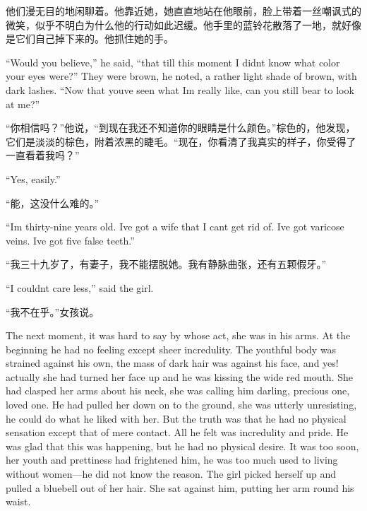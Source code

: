 \begin{paracol}{2}
\switchcolumn

他们漫无目的地闲聊着。他靠近她，她直直地站在他眼前，脸上带着一丝嘲讽式的微笑，似乎不明白为什么他的行动如此迟缓。他手里的蓝铃花散落了一地，就好像是它们自己掉下来的。他抓住她的手。

\switchcolumn*

``Would you believe,'' he said, ``that till this moment I
didn\textquotesingle t know what color your eyes were?'' They were brown,
he noted, a rather light shade of brown, with dark lashes. ``Now that
you\textquotesingle ve seen what I\textquotesingle m really like, can
you still bear to look at me?''

\switchcolumn

``你相信吗？''他说，``到现在我还不知道你的眼睛是什么颜色。''棕色的，他发现，它们是淡淡的棕色，附着浓黑的睫毛。``现在，你看清了我真实的样子，你受得了一直看着我吗？''

\switchcolumn*

``Yes, easily.''

\switchcolumn

``能，这没什么难的。''

\switchcolumn*

``I\textquotesingle m thirty-nine years old. I\textquotesingle ve got a
wife that I can\textquotesingle t get rid of. I\textquotesingle ve got
varicose veins. I\textquotesingle ve got five false teeth.''

\switchcolumn

``我三十九岁了，有妻子，我不能摆脱她。我有静脉曲张，还有五颗假牙。''

\switchcolumn*

``I couldn\textquotesingle t care less,'' said the girl.

\switchcolumn

``我不在乎。''女孩说。

\switchcolumn*

The next moment, it was hard to say by whose act, she was in his arms.
At the beginning he had no feeling except sheer incredulity. The
youthful body was strained against his own, the mass of dark hair was
against his face, and yes! actually she had turned her face up and he
was kissing the wide red mouth. She had clasped her arms about his neck,
she was calling him darling, precious one, loved one. He had pulled her
down on to the ground, she was utterly unresisting, he could do what he
liked with her. But the truth was that he had no physical sensation
except that of mere contact. All he felt was incredulity and pride. He
was glad that this was happening, but he had no physical desire. It was
too soon, her youth and prettiness had frightened him, he was too much
used to living without women---he did not know the reason. The girl
picked herself up and pulled a bluebell out of her hair. She sat against
him, putting her arm round his waist.


\end{paracol}
